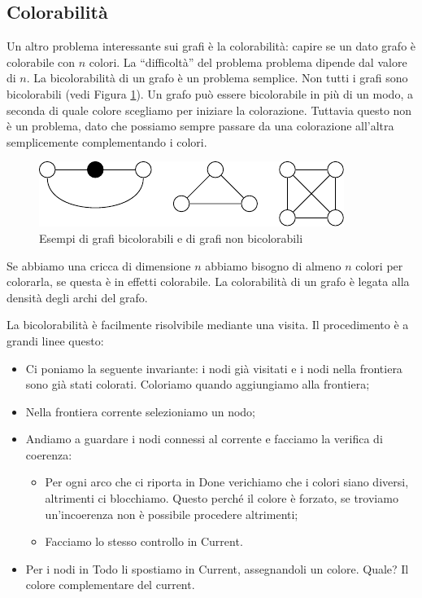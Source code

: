 \subsection{Colorabilità}

Un altro problema interessante sui grafi è la colorabilità: capire se un dato grafo è colorabile con
$n$ colori. La ``difficoltà'' del problema problema dipende dal valore di $n$. La bicolorabilità di
un grafo è un problema semplice. Non tutti i grafi sono bicolorabili (vedi Figura
\ref{TwoColorableGraphs}). Un grafo può essere bicolorabile in più di un modo, a seconda di quale
colore scegliamo per iniziare la colorazione. Tuttavia questo non è un problema, dato che possiamo
sempre passare da una colorazione all'altra semplicemente complementando i colori.

\begin{figure}[h]
    \begin{center}
        \includegraphics{./img/complexity_intro/2ColorableGraphs.pdf}
    \end{center}
    \caption{Esempi di grafi bicolorabili e di grafi non bicolorabili}
    \label{TwoColorableGraphs}
\end{figure}

Se abbiamo una cricca di dimensione $n$ abbiamo bisogno di almeno $n$ colori per colorarla, se
questa è in effetti colorabile. La colorabilità di un grafo è legata alla densità degli archi del
grafo.

La bicolorabilità è facilmente risolvibile mediante una visita. Il procedimento è a grandi linee
questo:
\begin{itemize}
    \item Ci poniamo la seguente invariante: i nodi già visitati e i nodi nella frontiera sono già
    stati colorati. Coloriamo quando aggiungiamo alla frontiera;
    \item Nella frontiera corrente selezioniamo un nodo;
    \item Andiamo a guardare i nodi connessi al corrente e facciamo la verifica di coerenza:
    \begin{itemize}
        \item Per ogni arco che ci riporta in Done verichiamo che i colori siano diversi, altrimenti
        ci blocchiamo. Questo perché il colore è forzato, se troviamo un'incoerenza non è
        possibile procedere altrimenti;
        \item Facciamo lo stesso controllo in Current.
    \end{itemize}
    \item Per i nodi in Todo li spostiamo in Current, assegnandoli un colore. Quale? Il colore
    complementare del current.
\end{itemize}

